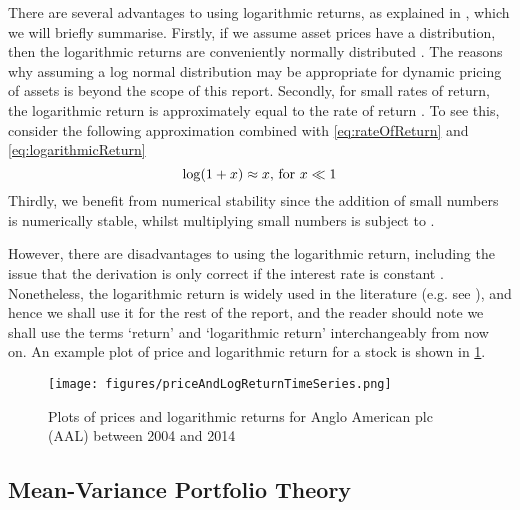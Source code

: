 There are several advantages to using logarithmic returns, as explained in \cite{QuaWp}, which we will briefly summarise.
Firstly, if we assume asset prices have a  distribution, then the logarithmic returns are conveniently normally distributed \cite{QuaWp}. The reasons why assuming a log normal distribution may be appropriate for dynamic pricing of assets is beyond the scope of this report.
Secondly, for small rates of return, the logarithmic return is approximately equal to the rate of return \cite{QuaWp}. To see this, consider the following approximation combined with \cref{eq:rateOfReturn} and \cref{eq:logarithmicReturn}
\begin{equation}
	\label{eq:logarithApproximation}
	\log(1 + x) \approx x \text{, for } x \ll 1
\end{equation}
Thirdly, we benefit from numerical stability since the addition of small numbers is numerically stable, whilst multiplying small numbers is subject to  \cite{QuaWp}.

However, there are disadvantages to using the logarithmic return, including the issue that the derivation is only correct if the interest rate is constant \cite{QuaWp,Onn02}.
Nonetheless, the logarithmic return is widely used in the literature (e.g. see \cite{Onn02,OCK+02,OKK03,FPM+10,FPW+11,MG13}), and hence we shall use it for the rest of the report, and the reader should note we shall use the terms `return' and `logarithmic return' interchangeably from now on. An example plot of price and logarithmic return for a stock is shown in \cref{fig:priceAndLogReturn}.

\begin{figure}
	\centering
	\texttt{[image: figures/priceAndLogReturnTimeSeries.png]}
	\caption[Example plot for price and logarithmic return]{\label{fig:priceAndLogReturn} Plots of prices and logarithmic returns for Anglo American plc (AAL) between 2004 and 2014}
\end{figure}


\subsection{Mean-Variance Portfolio Theory}
\label{subsec:portfolioTheoryBackground}

